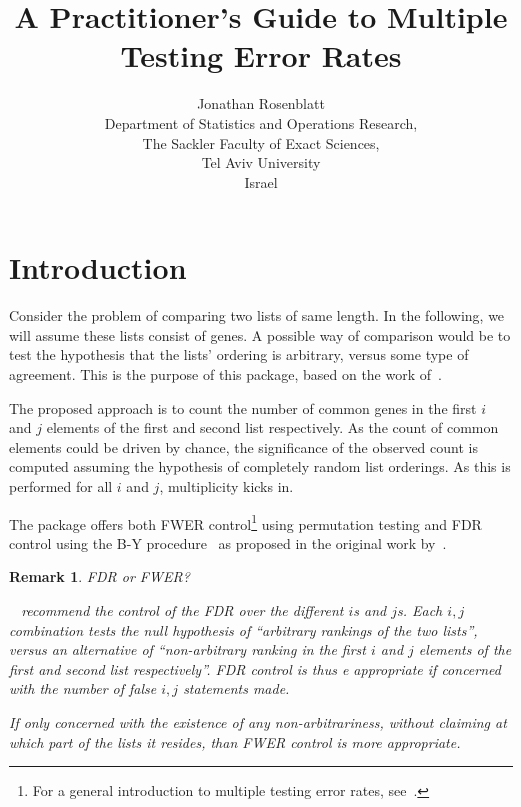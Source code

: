 \documentclass[11pt]{article}
\title{A Practitioner's Guide to Multiple Testing Error Rates}
\author{Jonathan Rosenblatt \\
        Department of Statistics and Operations Research,\\
        The Sackler Faculty of Exact Sciences, \\
        Tel Aviv University \\
        Israel}
\newtheorem{remark}{Remark}[section]
\begin{document}

\maketitle








\section{Introduction}

Consider the problem of comparing two lists of same length. In the following, we will assume these lists consist of genes.
A possible way of comparison would be to test the hypothesis that the lists' ordering is arbitrary, versus some type of agreement.
This is the purpose of this package, based on the work of~\citet{plaisier_rankrank_2010}.

The proposed approach is to count the number of common genes in the first $i$ and $j$ elements of the first and second list respectively. 
As the count of common elements could be driven by chance, the significance of the observed count is computed assuming the hypothesis of completely random list orderings. As this is performed for all $i$ and $j$, multiplicity kicks in.

The package offers both FWER control\footnote{ For a general introduction to multiple testing error rates, see~\citep{rosenblatt_practitioners_2013}.} using permutation testing and FDR control using the B-Y procedure~\citep{benjamini_control_2001} as proposed in the original work by~\citet{plaisier_rankrank_2010}.



\begin{remark} FDR or FWER?

~\citet{plaisier_rankrank_2010} recommend the control of the FDR over the different $i$s and $j$s. 
Each $i,j$ combination tests the null hypothesis of ``arbitrary rankings of the two lists'', versus an alternative of ``non-arbitrary ranking in the first $i$ and $j$ elements of the first and second list respectively''.
FDR control is thus e appropriate if concerned with the number of false $i,j$ statements made. 

If only concerned with the existence of any non-arbitrariness, without claiming at which part of the lists it resides, than FWER control is more appropriate. 
\end{remark}
\end{document}
